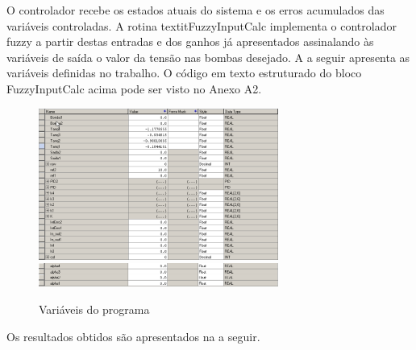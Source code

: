 O controlador recebe os estados atuais do sistema e os erros acumulados das variáveis controladas. A rotina textit{FuzzyInputCalc} implementa o controlador fuzzy a partir destas entradas e dos ganhos já apresentados assinalando às variáveis de saída o valor da tensão nas bombas desejado. A  a seguir apresenta as variáveis definidas no trabalho. O código em texto estruturado do bloco FuzzyInputCalc acima pode ser visto no Anexo A2.

\begin{figure}[H]
	\centering
	\includegraphics[width=0.7\textwidth]{img/tags1.png}\\
	\includegraphics[width=0.7\textwidth]{img/tags2.png}
	\caption{Variáveis do programa}
	\label{figCLPTags1}
\end{figure}

Os resultados obtidos são apresentados na  a seguir.

%

